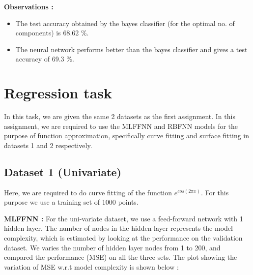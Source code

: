 \documentclass{article}
\begin{document}
\begin{flushleft}
\textbf{Observations :}
\begin{itemize}
\item The test accuracy obtained by the bayes classifier (for the optimal no. of components) is 68.62 \%.
\item The neural network performs better than the bayes classifier and gives a test accuracy of 69.3 \%. 
\end{itemize}


\end{flushleft}
\newpage



















\section{Regression task}

In this task, we are given the same 2 datasets as the first assignment. In this assignment, we are required to use the MLFFNN and RBFNN models for the purpose of function approximation, specifically curve fitting and surface fitting in datasets 1 and 2 respectively.


\subsection{Dataset 1 (Univariate)}
\begin{flushleft}
Here, we are required to do curve fitting of the function $e^{cos(2 \pi x)}$. For this purpose we use a training set of 1000 points.



\end{flushleft}


\begin{flushleft}

\textbf{MLFFNN :}
For the uni-variate dataset, we use a feed-forward network with 1 hidden layer. The number of nodes in the hidden layer represents the model complexity, which is estimated by looking at the performance on the validation dataset. We varies the number of hidden layer nodes from 1 to 200, and compared the performance   (MSE) on all the three sets. The plot showing the variation of MSE w.r.t model complexity is shown below :

\end{flushleft}
\end{document}

